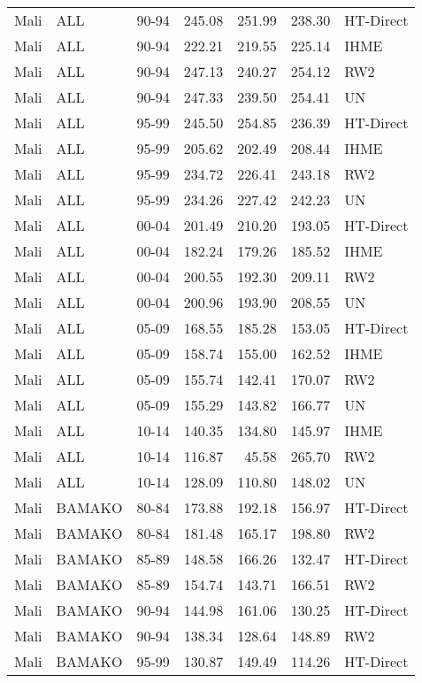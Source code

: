 \begin{longtable}{lllrrrl}
  Mali & ALL & 90-94 & 245.08 & 251.99 & 238.30 & HT-Direct \\ 
  Mali & ALL & 90-94 & 222.21 & 219.55 & 225.14 & IHME \\ 
  Mali & ALL & 90-94 & 247.13 & 240.27 & 254.12 & RW2 \\ 
  Mali & ALL & 90-94 & 247.33 & 239.50 & 254.41 & UN \\ 
  Mali & ALL & 95-99 & 245.50 & 254.85 & 236.39 & HT-Direct \\ 
  Mali & ALL & 95-99 & 205.62 & 202.49 & 208.44 & IHME \\ 
  Mali & ALL & 95-99 & 234.72 & 226.41 & 243.18 & RW2 \\ 
  Mali & ALL & 95-99 & 234.26 & 227.42 & 242.23 & UN \\ 
  Mali & ALL & 00-04 & 201.49 & 210.20 & 193.05 & HT-Direct \\ 
  Mali & ALL & 00-04 & 182.24 & 179.26 & 185.52 & IHME \\ 
  Mali & ALL & 00-04 & 200.55 & 192.30 & 209.11 & RW2 \\ 
  Mali & ALL & 00-04 & 200.96 & 193.90 & 208.55 & UN \\ 
  Mali & ALL & 05-09 & 168.55 & 185.28 & 153.05 & HT-Direct \\ 
  Mali & ALL & 05-09 & 158.74 & 155.00 & 162.52 & IHME \\ 
  Mali & ALL & 05-09 & 155.74 & 142.41 & 170.07 & RW2 \\ 
  Mali & ALL & 05-09 & 155.29 & 143.82 & 166.77 & UN \\ 
  Mali & ALL & 10-14 & 140.35 & 134.80 & 145.97 & IHME \\ 
  Mali & ALL & 10-14 & 116.87 & 45.58 & 265.70 & RW2 \\ 
  Mali & ALL & 10-14 & 128.09 & 110.80 & 148.02 & UN \\ 
  Mali & BAMAKO & 80-84 & 173.88 & 192.18 & 156.97 & HT-Direct \\ 
  Mali & BAMAKO & 80-84 & 181.48 & 165.17 & 198.80 & RW2 \\ 
  Mali & BAMAKO & 85-89 & 148.58 & 166.26 & 132.47 & HT-Direct \\ 
  Mali & BAMAKO & 85-89 & 154.74 & 143.71 & 166.51 & RW2 \\ 
  Mali & BAMAKO & 90-94 & 144.98 & 161.06 & 130.25 & HT-Direct \\ 
  Mali & BAMAKO & 90-94 & 138.34 & 128.64 & 148.89 & RW2 \\ 
  Mali & BAMAKO & 95-99 & 130.87 & 149.49 & 114.26 & HT-Direct \\ 

\end{longtable}
